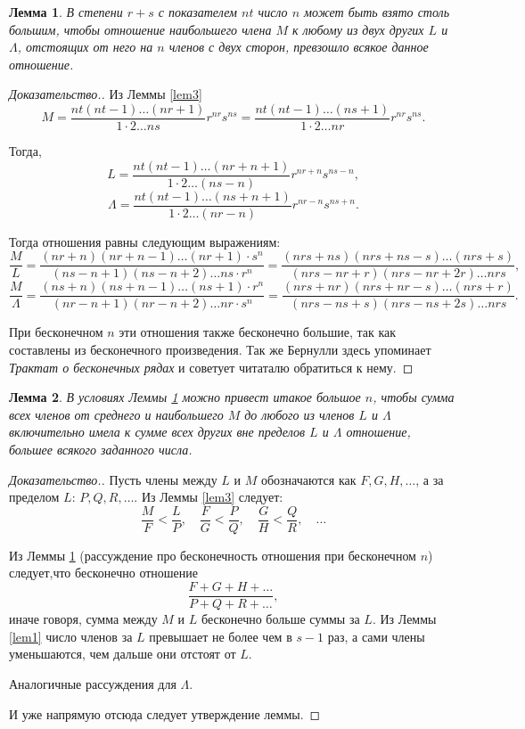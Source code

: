 \documentclass[12pt]{article}
\newtheorem{lemma}{Лемма}
\begin{document}
\begin{lemma} \label{lem4}
В степени $r+s$ с показателем $nt$ число $n$ может быть взято столь большим, чтобы отношение наибольшего члена $M$ к любому из двух других $L$ и $\Lambda$, отстоящих от него на $n$ членов с двух сторон, превзошло всякое данное отношение.
\end{lemma}
\begin{proof}[Доказательство.]
Из Леммы \ref{lem3} $$M = \frac{nt (nt-1) \dots (nr+1)}{1 \cdot 2 \dots ns} r^{nr} s^{ns} = 
\frac{nt (nt-1) \dots (ns+1)}{1 \cdot 2 \dots nr} r^{nr} s^{ns}.$$

Тогда, $$L = \frac{nt (nt-1) \dots (nr+n+1)}{1 \cdot 2 \dots (ns-n)} r^{nr+n} s^{ns-n},$$
$$\Lambda = \frac{nt (nt-1) \dots (ns+n+1)}{1 \cdot 2 \dots (nr-n)} r^{nr-n} s^{ns+n}.$$

Тогда отношения равны следующим выражениям:
$$\frac{M}{L} = \frac{(nr+n) (nr+n -1) \dots (nr+1) \cdot s^n}{(ns-n + 1) (ns-n+2) \dots ns \cdot r^n}= \frac{(nrs+ns) (nrs+ns-s) \dots (nrs+s)}{(nrs-nr+r) (nrs-nr+2r) \dots nrs},$$
$$\frac{M}{\Lambda} = \frac{(ns+n) (ns+n -1) \dots (ns+1) \cdot r^n}{(nr-n + 1) (nr-n+2) \dots nr \cdot s^n}= \frac{(nrs+nr) (nrs+nr-s) \dots (nrs+r)}{(nrs-ns+s) (nrs-ns+2s) \dots nrs}.$$

При бесконечном $n$ эти отношения также бесконечно большие, так как составлены из бесконечного произведения. 
Так же Бернулли здесь упоминает \textit{Трактат о бесконечных рядах} и советует читаталю обратиться к нему.
\end{proof}

\begin{lemma} \label{lem5}
В условиях Леммы \ref{lem4} можно привест итакое большое $n$, чтобы сумма всех членов от среднего и наибольшего $M$ до любого из членов $L$ и $\Lambda$ включительно имела к сумме всех других вне пределов $L$ и $\Lambda$ отношение, большее всякого заданного числа.
\end{lemma}
\begin{proof}[Доказательство.]
Пусть члены между $L$ и $M$ обозначаются как $F, G, H, \dots$, а за пределом $L$: $P, Q, R, \dots$.
Из Леммы \ref{lem3} следует:
$$\frac{M}{F} < \frac{L}{P}, \quad \frac{F}{G} < \frac{P}{Q}, \quad \frac{G}{H} < \frac{Q}{R}, \quad \dots$$

Из Леммы \ref{lem4} (рассуждение про бесконечность отношения при бесконечном $n$) следует,что бесконечно отношение
$$\frac{F+G+H+\dots}{P+Q+R+\dots},$$
иначе говоря, сумма между $M$ и $L$ бесконечно больше суммы за $L$.
Из Леммы \ref{lem1} число членов за $L$ превышает не более чем в $s-1$ раз, а сами члены уменьшаются, чем дальше они отстоят от $L$.

Аналогичные рассуждения для $\Lambda$.

И уже напрямую отсюда следует утверждение леммы.
\end{proof}
\end{document}
